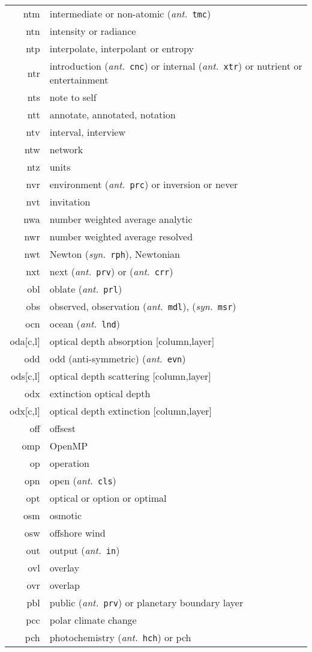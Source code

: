 \documentclass[12pt,twoside]{article}
\newcommand{\ant}[1]{(\textit{ant.}~\texttt{#1})}
\newcommand{\syn}[1]{(\textit{syn.}~\texttt{#1})}
\begin{document}
\begin{longtable}[>{\bfseries}l]{>{\ttfamily}r l}
ntm & intermediate or non-atomic \ant{tmc} \\
ntn & intensity or radiance \\
ntp & interpolate, interpolant or entropy \\
ntr & introduction \ant{cnc} or internal \ant{xtr} or nutrient or entertainment \\
nts & note to self \\
ntt & annotate, annotated, notation \\
ntv & interval, interview \\
ntw & network \\
ntz & units \\
nvr & environment \ant{prc} or inversion or never \\
nvt & invitation \\
nwa & number weighted average analytic \\
nwr & number weighted average resolved \\
nwt & Newton \syn{rph}, Newtonian \\
nxt & next \ant{prv} or \ant{crr} \\
obl & oblate \ant{prl} \\
obs & observed, observation \ant{mdl}, \syn{msr} \\
ocn & ocean \ant{lnd} \\
oda[c,l] & optical depth absorption [column,layer] \\
odd & odd (anti-symmetric) \ant{evn} \\
ods[c,l] & optical depth scattering [column,layer] \\
odx & extinction optical depth \\
odx[c,l] & optical depth extinction [column,layer] \\
off & offsest \\
omp & OpenMP \\
op & operation \\
opn & open \ant{cls} \\
opt & optical or option or optimal \\
osm & osmotic \\
osw & offshore wind \\
out & output \ant{in} \\
ovl & overlay \\
ovr & overlap \\
pbl & public \ant{prv} or planetary boundary layer \\
pcc & polar climate change \\
pch & photochemistry \ant{hch} or pch \\

\end{longtable}
\end{document}

